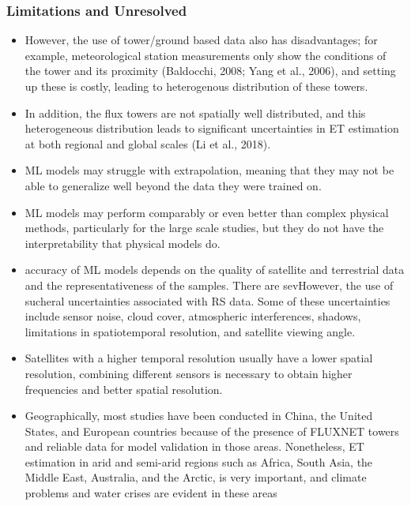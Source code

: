 \documentclass[paper=a4, fontsize=12pt]{scrartcl}
\begin{document}
	\subsubsection{Limitations and Unresolved}
	\begin{itemize}
		\item However, the use of tower/ground based data also has disadvantages; for example, meteorological station measurements only show the conditions of the tower and its proximity (Baldocchi, 2008; Yang et al., 2006), and setting up these is costly, leading to heterogenous distribution of these towers.
		\item In addition, the flux towers are not spatially well distributed, and this heterogeneous distribution leads to significant uncertainties in ET estimation at both regional and global scales (Li et al., 2018).
		\item ML models may struggle with extrapolation, meaning that they may not be able to generalize well beyond the data they were trained on.
		\item ML models may perform comparably or even better than complex physical methods, particularly for the large scale studies, but they do not have the interpretability that physical models do.
		\item accuracy of ML models depends on the quality of satellite and terrestrial data and the representativeness of the samples. There are sevHowever, the use of sucheral uncertainties associated with RS data. Some of these uncertainties include sensor noise, cloud cover, atmospheric interferences, shadows, limitations in spatiotemporal resolution, and satellite viewing angle. 
		\item Satellites with a higher temporal resolution usually have a lower spatial resolution, combining different sensors is necessary to obtain higher frequencies and better spatial resolution.
		\item Geographically, most studies have been conducted in China, the United States, and European countries because of the presence of FLUXNET towers and reliable data for model validation in those areas. Nonetheless, ET estimation in arid and semi-arid regions such as Africa, South Asia, the Middle East, Australia, and the Arctic, is very important, and climate problems and water crises are evident in these areas
	\end{itemize}
	
	
\end{document}
